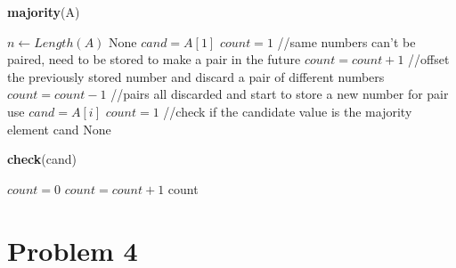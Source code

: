 \documentclass[twoside]{homework}
\begin{document}
\begin{algorithm}
	\caption*{\textbf{majority}(A)}
	\begin{algorithmic}	
		\STATE $n \leftarrow Length(A)$
		\RETURN None
		\ENDIF 
		\STATE $cand=A[1]$
		\STATE $count= 1$
		\STATE //same numbers can't be paired, need to be stored to make a pair in the future
		\STATE $count = count + 1$
		\ELSE
		\STATE //offset the previously stored number and discard a pair of different numbers
		\STATE $count=count-1$
		\ENDIF
		\STATE //pairs all discarded and start to store a new number for pair use
		\STATE $cand= A[i]$
		\STATE $count= 1$
		\ENDIF
		\ENDFOR
		\STATE //check if the candidate value is the majority element
		\RETURN cand
		\ELSE
		\RETURN None
		\ENDIF
	\end{algorithmic}	
\end{algorithm}
\begin{algorithm}
	\caption*{\textbf{check}(cand)}
	\begin{algorithmic}
		\STATE $count=0$	
		\FOR{$i=1$ to n}
		\IF{$cand = A[i]$}
		\STATE $count = count + 1$
		\ENDIF
		\ENDFOR
		\RETURN count
	\end{algorithmic}	
\end{algorithm}
\section*{Problem 4}
\begin{center}
\end{center}
\end{document}
